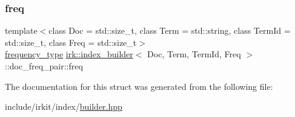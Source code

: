 \subsubsection{\texorpdfstring{freq}{freq}}
{\footnotesize\ttfamily template$<$class Doc  = std\+::size\+\_\+t, class Term  = std\+::string, class Term\+Id  = std\+::size\+\_\+t, class Freq  = std\+::size\+\_\+t$>$ \\
\mbox{\hyperlink{classirk_1_1index__builder_af2efa68fc3f10fd9cb000d16279bfbb1}{frequency\+\_\+type}} \mbox{\hyperlink{classirk_1_1index__builder}{irk\+::index\+\_\+builder}}$<$ Doc, Term, Term\+Id, Freq $>$\+::doc\+\_\+freq\+\_\+pair\+::freq}



The documentation for this struct was generated from the following file\+:\begin{DoxyCompactItemize}
\item 
include/irkit/index/\mbox{\hyperlink{builder_8hpp}{builder.\+hpp}}\end{DoxyCompactItemize}
